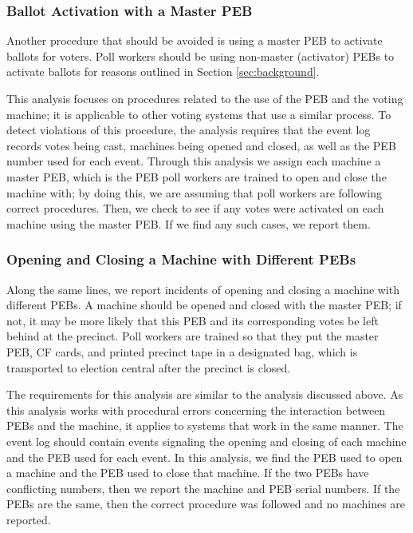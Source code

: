 \subsubsection{Ballot Activation with a Master PEB}
Another procedure that should be avoided is using a master PEB to activate ballots for voters.  Poll workers should be using non-master (activator) PEBs to activate ballots for reasons outlined in Section \ref{sec:background}.

This analysis focuses on procedures related to the use of the PEB and the voting machine; it is applicable to other voting systems that use a similar process.  To detect violations of this procedure, the analysis requires that the event log records votes being cast, machines being opened and closed, as well as the PEB number used for each event.  Through this analysis we assign each machine a master PEB, which is the PEB poll workers are trained to open and close the machine with; by doing this, we are assuming that poll workers are following correct procedures.  Then, we check to see if any votes were activated on each machine using the master PEB.  If we find any such cases, we report them.  

\subsubsection{Opening and Closing a Machine with Different PEBs}
Along the same lines, we report incidents of opening and closing a machine with different PEBs. A machine should be opened and closed with the master PEB; if not, it may be more likely that this PEB and its corresponding votes be left behind at the precinct.  Poll workers are trained so that they put the master PEB, CF cards, and printed precinct tape in a designated bag, which is transported to election central after the precinct is closed.  

The requirements for this analysis are similar to the analysis discussed above.  As this analysis works with procedural errors concerning the interaction between PEBs and the machine, it applies to systems that work in the same manner.  The event log should contain events signaling the opening and closing of each machine and the PEB used for each event.  In this analysis, we find the PEB used to open a machine and the PEB used to close that machine.  If the two PEBs have conflicting numbers, then we report the machine and PEB serial numbers.  If the PEBs are the same, then the correct procedure was followed and no machines are reported.  

